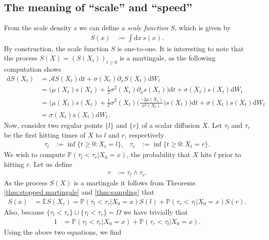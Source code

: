 \documentclass[12pt]{book}
\numberwithin{equation}{chapter}
\theoremstyle{plain}
\numberwithin{theorem}{section}
\theoremstyle{definition}
\numberwithin{exercise}{chapter}
\newcommand{\<}{\langle}
\renewcommand{\>}{\rangle}
\renewcommand{\(}{\left(}
\renewcommand{\)}{\right)}
\renewcommand{\[}{\left[}
\renewcommand{\]}{\right]}
\newcommand\Eb{\mathds{E}}
\newcommand\Pb{\mathds{P}}
\newcommand\Ac{\mathscr{A}}
\newcommand\Om{\Omega}
\newcommand\sig{\sigma}
\renewcommand\d{\partial}
\newcommand\dd{\mathrm{d}}
\newcommand{\blu}[1]{\textcolor{blue}{#1}}
\begin{document}
\subsection*{The meaning of ``scale'' and ``speed''}
From the scale density $s$ we can define a \textit{scale function} $S$, which is given by
\begin{align}
S(x)
	&:=	\int \dd x \, s(x) .
\end{align}
By construction, the scale function $S$ is one-to-one.  It is interesting to note that the process $S(X)=(S(X_t))_{t \geq 0}$ is a martingale, as the following computation shows
\begin{align}
\dd S(X_t)
	&=	\Ac S(X_t) \dd t + \sig(X_t) \d_x S(X_t) \dd W_t \\
	&=	\Big( \mu(X_t) s(X_t) + \tfrac{1}{2} \sig^2 (X_t) \d_x s(X_t) \Big) \dd t + \sig(X_t) s(X_t) \dd W_t \\
	&=	\Big( \mu(X_t) s(X_t) + \tfrac{1}{2} \sig^2 (X_t) \Big( \frac{- 2 \mu(X_t)}{\sig^2(X_t)} \Big) s(X_t) \Big) \dd t + \sig(X_t) s(X_t) \dd W_t \\
	&=	\sig(X_t) s(X_t) \dd W_t . \label{eq:dSX}
\end{align}
Now,  consider two regular points $\{l\}$ and $\{r\}$ of a scalar diffusion $X$.  Let $\tau_l$ and $\tau_r$ be the first hitting times of $X$ to $l$ and $r$, respectively
\begin{align}
\tau_l
	&:=	\inf\{ t \geq 0 : X_t = l \} , &
\tau_r
	&:=	\inf\{ t \geq 0 : X_t = r \} .
\end{align}
We wish to compute $\Pb( \tau_l < \tau_r | X_0 = x)$, the probability that $X$ hits $l$ prior to hitting $r$.  Let us define
\begin{align}
\tau
	&:=	\tau_l \wedge \tau_r .
\end{align}
As the process $S(X)$ is a martingale it follows from Theorems \ref{thm:stopped.martingale} and \ref{thm:sampling} that
\begin{align}
S(x)
	&=	\Eb S( X_\tau)
	 =	\Pb( \tau_l < \tau_r | X_0 = x ) S( l ) + \Pb( \tau_r < \tau_l | X_0 = x ) S( r ) .
\end{align}
Also, because $\{ \tau_l < \tau_r \} \cup \{ \tau_l < \tau_r \} = \Om$ we have trivially that
\begin{align}
1
	&=	\Pb( \tau_l < \tau_r | X_0 = x ) + \Pb( \tau_r < \tau_l | X_0 = x ) .
\end{align}
Using the above two equations, we find
\end{document}
